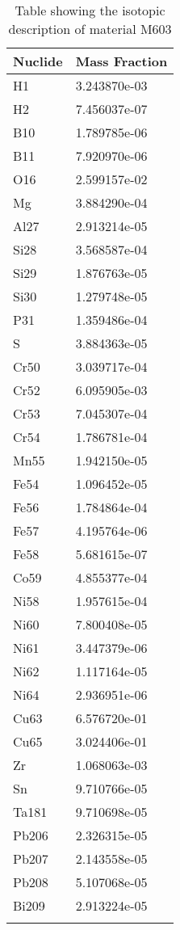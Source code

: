 \begin{centering}
\begin{longtable}[ht!]
{ p{} | p{} }
\hline
Nuclide & Mass Fraction\\
\hline
H1 & 3.243870e-03\\
H2 & 7.456037e-07\\
B10 & 1.789785e-06\\
B11 & 7.920970e-06\\
O16 & 2.599157e-02\\
Mg & 3.884290e-04\\
Al27 & 2.913214e-05\\
Si28 & 3.568587e-04\\
Si29 & 1.876763e-05\\
Si30 & 1.279748e-05\\
P31 & 1.359486e-04\\
S & 3.884363e-05\\
Cr50 & 3.039717e-04\\
Cr52 & 6.095905e-03\\
Cr53 & 7.045307e-04\\
Cr54 & 1.786781e-04\\
Mn55 & 1.942150e-05\\
Fe54 & 1.096452e-05\\
Fe56 & 1.784864e-04\\
Fe57 & 4.195764e-06\\
Fe58 & 5.681615e-07\\
Co59 & 4.855377e-04\\
Ni58 & 1.957615e-04\\
Ni60 & 7.800408e-05\\
Ni61 & 3.447379e-06\\
Ni62 & 1.117164e-05\\
Ni64 & 2.936951e-06\\
Cu63 & 6.576720e-01\\
Cu65 & 3.024406e-01\\
Zr & 1.068063e-03\\
Sn & 9.710766e-05\\
Ta181 & 9.710698e-05\\
Pb206 & 2.326315e-05\\
Pb207 & 2.143558e-05\\
Pb208 & 5.107068e-05\\
Bi209 & 2.913224e-05\\

\caption{Table showing the isotopic description of material M603}
\label{table:material_M603}
\end{longtable}\clearpage


\end{centering}
